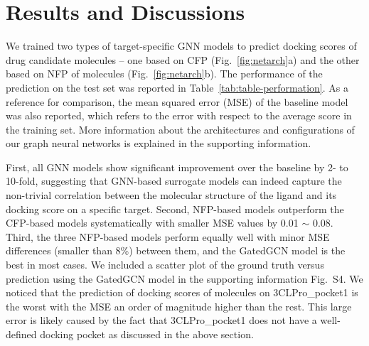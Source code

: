 \documentclass[conference]{IEEEtran}
\begin{document}

\section{Results and Discussions}
We trained two types of target-specific GNN models to predict docking scores of drug candidate molecules  -- one based on CFP (Fig.~\ref{fig:netarch}a) and the other based on NFP of molecules (Fig.~\ref{fig:netarch}b). The performance of the prediction on the test set was reported in Table~\ref{tab:table-performation}. As a reference for comparison, the mean squared error (MSE) of the baseline model was also reported, which refers to the error with respect to the average score in the training set. More information about the architectures and configurations of our graph neural networks is explained in the supporting information.

First, all GNN models show significant improvement over the baseline by 2- to 10-fold, suggesting that GNN-based surrogate models can indeed capture the non-trivial correlation between the molecular structure of the ligand and its docking score on a specific target. Second, NFP-based models outperform the CFP-based models systematically with smaller MSE values by 0.01 $\sim$ 0.08. Third, the three NFP-based models perform equally well with minor MSE differences (smaller than 8\%) between them, and the GatedGCN model is the best in most cases. We included a scatter plot of the ground truth versus prediction using the GatedGCN model in the supporting information Fig.~S4. We noticed that the prediction of docking scores of molecules on 3CLPro\_pocket1 is the worst with the MSE an order of magnitude higher than the rest. This large error is likely caused by the fact that 3CLPro\_pocket1 does not have a well-defined docking pocket as discussed in the above section.
\end{document}
